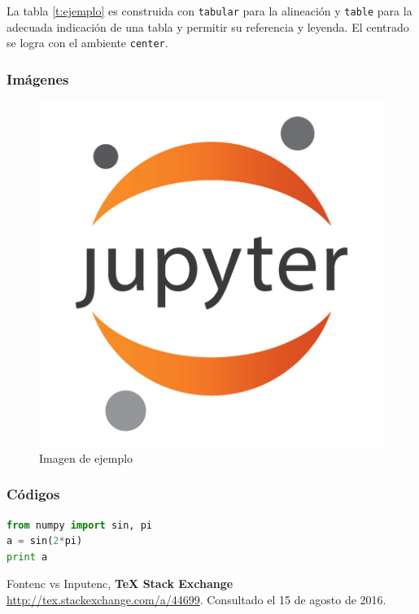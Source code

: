 \documentclass[12pt]{article}
\begin{document}
La tabla \ref{t:ejemplo} es construida con \verb-tabular- para la alineación y \verb-table- para la adecuada indicación de una tabla y permitir su referencia y leyenda. El centrado se logra con el ambiente \verb-center-.

\subsubsection{Imágenes}

\begin{figure}[h]
\begin{flushright}
\includegraphics[scale=0.5]{jupyter.png}
\caption{Imagen de ejemplo} \label{i:ejemplo}
\end{flushright}
\end{figure}

\subsubsection{Códigos}
\begin{lstlisting}[language=python]
from numpy import sin, pi
a = sin(2*pi)
print a
\end{lstlisting}
 
%

\begin{thebibliography}{9}
 Fontenc vs Inputenc, \textbf{TeX Stack Exchange} \url{http://tex.stackexchange.com/a/44699}. Consultado el 15 de agosto de 2016.
\end{thebibliography}
\end{document}
